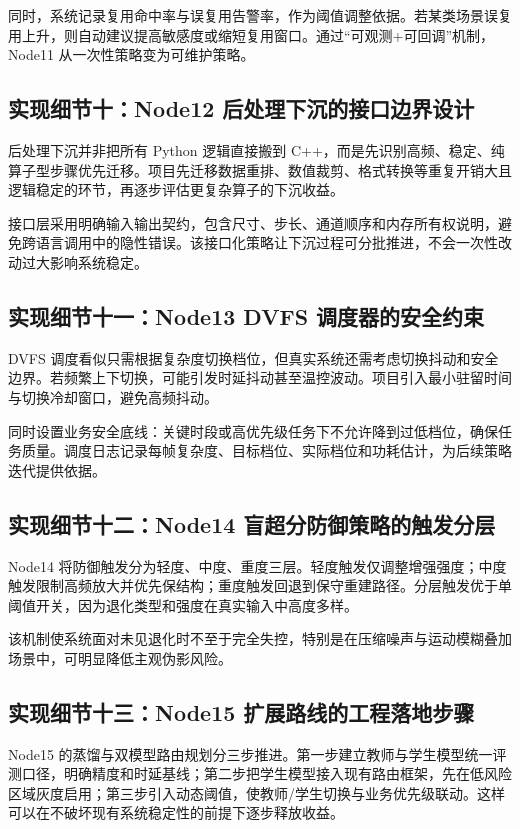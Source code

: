 \documentclass[12pt,a4paper]{ctexart}
\begin{document}
同时，系统记录复用命中率与误复用告警率，作为阈值调整依据。若某类场景误复用上升，则自动建议提高敏感度或缩短复用窗口。通过“可观测+可回调”机制，Node11 从一次性策略变为可维护策略。

\subsection{实现细节十：Node12 后处理下沉的接口边界设计}

后处理下沉并非把所有 Python 逻辑直接搬到 C++，而是先识别高频、稳定、纯算子型步骤优先迁移。项目先迁移数据重排、数值裁剪、格式转换等重复开销大且逻辑稳定的环节，再逐步评估更复杂算子的下沉收益。

接口层采用明确输入输出契约，包含尺寸、步长、通道顺序和内存所有权说明，避免跨语言调用中的隐性错误。该接口化策略让下沉过程可分批推进，不会一次性改动过大影响系统稳定。

\subsection{实现细节十一：Node13 DVFS 调度器的安全约束}

DVFS 调度看似只需根据复杂度切换档位，但真实系统还需考虑切换抖动和安全边界。若频繁上下切换，可能引发时延抖动甚至温控波动。项目引入最小驻留时间与切换冷却窗口，避免高频抖动。

同时设置业务安全底线：关键时段或高优先级任务下不允许降到过低档位，确保任务质量。调度日志记录每帧复杂度、目标档位、实际档位和功耗估计，为后续策略迭代提供依据。

\subsection{实现细节十二：Node14 盲超分防御策略的触发分层}

Node14 将防御触发分为轻度、中度、重度三层。轻度触发仅调整增强强度；中度触发限制高频放大并优先保结构；重度触发回退到保守重建路径。分层触发优于单阈值开关，因为退化类型和强度在真实输入中高度多样。

该机制使系统面对未见退化时不至于完全失控，特别是在压缩噪声与运动模糊叠加场景中，可明显降低主观伪影风险。

\subsection{实现细节十三：Node15 扩展路线的工程落地步骤}

Node15 的蒸馏与双模型路由规划分三步推进。第一步建立教师与学生模型统一评测口径，明确精度和时延基线；第二步把学生模型接入现有路由框架，先在低风险区域灰度启用；第三步引入动态阈值，使教师/学生切换与业务优先级联动。这样可以在不破坏现有系统稳定性的前提下逐步释放收益。
\end{document}
